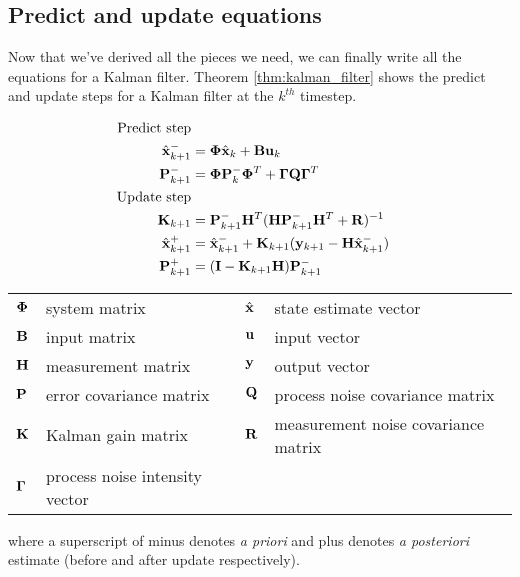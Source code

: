 \subsection{Predict and update equations}

Now that we've derived all the pieces we need, we can finally write all the
equations for a Kalman filter. Theorem \ref{thm:kalman_filter} shows the predict
and update steps for a Kalman filter at the $k^{th}$ timestep.

\begin{theorem}
  \label{thm:kalman_filter}

  \begin{align}
    \text{Predict step} \nonumber \\
    \hat{\mathbf{x}}_{k+1}^- &= \mathbf{\Phi}\hat{\mathbf{x}}_k + \mathbf{B} \mathbf{u}_k
      \label{eq:pre1_x} \\
    \mathbf{P}_{k+1}^- &= \mathbf{\Phi} \mathbf{P}_k^- \mathbf{\Phi}^T +
      \mathbf{\Gamma}\mathbf{Q}\mathbf{\Gamma}^T \\
    \text{Update step} \nonumber \\
    \mathbf{K}_{k+1} &=
      \mathbf{P}_{k+1}^- \mathbf{H}^T (\mathbf{H}\mathbf{P}_{k+1}^- \mathbf{H}^T +
      \mathbf{R})^{-1} \\
    \hat{\mathbf{x}}_{k+1}^+ &=
      \hat{\mathbf{x}}_{k+1}^- + \mathbf{K}_{k+1}(\mathbf{y}_{k+1} -
      \mathbf{H} \hat{\mathbf{x}}_{k+1}^-) \label{eq:post1_x} \\
    \mathbf{P}_{k+1}^+ &= (\mathbf{I} - \mathbf{K}_{k+1}\mathbf{H})\mathbf{P}_{k+1}^-
  \end{align}

  \begin{figurekey}
    \begin{tabulary}{\linewidth}{LLLL}
      $\mathbf{\Phi}$ & system matrix & $\hat{\mathbf{x}}$ & state estimate vector \\
      $\mathbf{B}$ & input matrix            & $\mathbf{u}$ & input vector \\
      $\mathbf{H}$ & measurement matrix      & $\mathbf{y}$ & output vector \\
      $\mathbf{P}$ & error covariance matrix & $\mathbf{Q}$ & process noise covariance
        matrix \\
      $\mathbf{K}$ & Kalman gain matrix & $\mathbf{R}$ & measurement noise covariance
        matrix \\
      $\mathbf{\Gamma}$ & process noise intensity vector &
    \end{tabulary}
  \end{figurekey}

  where a superscript of minus denotes \textit{a priori} and plus denotes
  \textit{a posteriori} estimate (before and after update respectively).
\end{theorem}

